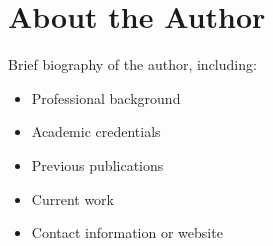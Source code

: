 \documentclass[11pt,a4paper,oneside]{book}
\begin{document}
\printindex

\chapter*{About the Author}

Brief biography of the author, including:
\begin{itemize}
    \item Professional background
    \item Academic credentials
    \item Previous publications
    \item Current work
    \item Contact information or website
\end{itemize}
\end{document}
